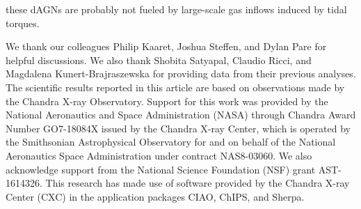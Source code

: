 \documentclass[iop,revtex4,twocolumn,apj,numberedappendix,appendixfloats]{emulateapj}
\begin{document}
these dAGNs are probably not fueled by large-scale gas inflows induced by tidal torques.

\acknowledgments

We thank our colleagues Philip Kaaret, Joshua Steffen, and Dylan Pare for helpful discussions. We also thank Shobita Satyapal, Claudio Ricci, and Magdalena Kunert-Brajraszewska for providing data from their previous analyses. 
The scientific results reported in this article are based on observations made by the Chandra X-ray Observatory.
Support for this work was provided by the National Aeronautics and Space Administration (NASA) through Chandra Award Number GO7-18084X issued by the Chandra X-ray Center, which is operated by the Smithsonian Astrophysical Observatory for and on behalf of the National Aeronautics Space Administration under contract NAS8-03060.
We also acknowledge support from the National Science Foundation (NSF) grant AST-1614326. 
This research has made use of software provided by the Chandra X-ray Center (CXC) in the application packages CIAO, ChIPS, and Sherpa.



\end{document}
